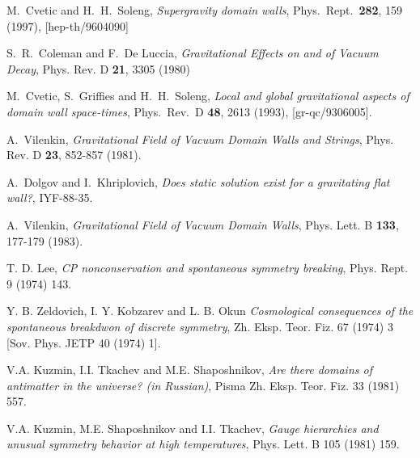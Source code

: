 \documentclass[aps,12pt, a4paper,nofootinbib]{revtex4}
\begin{document}
{\begin{thebibliography}{99}
  M.~Cvetic and H.~H.~Soleng,
  {\it Supergravity domain walls},
  Phys.\ Rept.\  {\bf 282}, 159 (1997),
  [hep-th/9604090]

  
S.~R.~Coleman and F.~De Luccia,
{\it Gravitational Effects on and of Vacuum Decay},
Phys. Rev. D \textbf{21}, 3305 (1980)
	
  M.~Cvetic, S.~Griffies and H.~H.~Soleng,
  {\it Local and global gravitational aspects of domain wall space-times},
  Phys.\ Rev.\ D {\bf 48}, 2613 (1993),
  [gr-qc/9306005].
  
  

  
A.~Vilenkin,
{\it Gravitational Field of Vacuum Domain Walls and Strings},
Phys. Rev. D \textbf{23}, 852-857 (1981).

A.~Dolgov and I.~Khriplovich,
{\it Does static solution exist for a gravitating flat wall?},
IYF-88-35.

A.~Vilenkin,
{\it Gravitational Field of Vacuum Domain Walls},
Phys. Lett. B \textbf{133}, 177-179 (1983).


  T. D. Lee, 
  {\it CP nonconservation and spontaneous symmetry breaking}, Phys. Rept. 9 (1974) 143.
	
  Y. B. Zeldovich, I. Y. Kobzarev and L. B. Okun 
  {\it Cosmological consequences of the spontaneous breakdwon of discrete symmetry}, Zh. Eksp. Teor. Fiz. 67 (1974) 3 [Sov. Phys. JETP 40 (1974) 1].
	
V.A. Kuzmin, I.I. Tkachev and M.E. Shaposhnikov, 
{\it Are there domains of antimatter in the universe? (in Russian)},
Pisma Zh. Eksp. Teor. Fiz. 33 (1981) 557.

V.A. Kuzmin, M.E. Shaposhnikov and I.I. Tkachev, 
{\it Gauge hierarchies and unusual symmetry behavior at high temperatures}, 
Phys. Lett. B 105 (1981) 159.


\end{thebibliography}}
\end{document}
